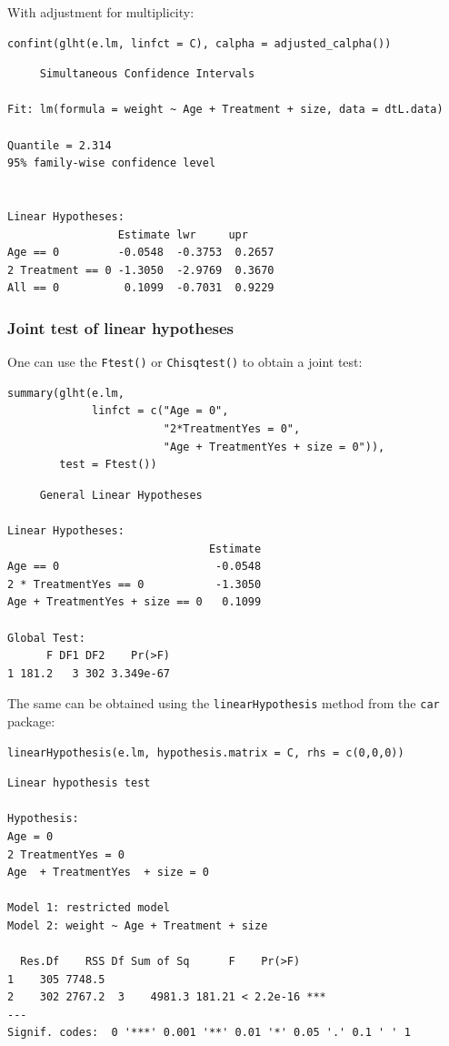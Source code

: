 \documentclass{article}
\begin{document}
With adjustment for multiplicity:
\lstset{language=r,label= ,caption= ,captionpos=b,numbers=none}
\begin{lstlisting}
confint(glht(e.lm, linfct = C), calpha = adjusted_calpha())
\end{lstlisting}

\begin{verbatim}
	 Simultaneous Confidence Intervals

Fit: lm(formula = weight ~ Age + Treatment + size, data = dtL.data)

Quantile = 2.314
95% family-wise confidence level
 

Linear Hypotheses:
                 Estimate lwr     upr    
Age == 0         -0.0548  -0.3753  0.2657
2 Treatment == 0 -1.3050  -2.9769  0.3670
All == 0          0.1099  -0.7031  0.9229
\end{verbatim}

\subsubsection{Joint test of linear hypotheses}
\label{sec:orgeec8701}

One can use the \texttt{Ftest()} or \texttt{Chisqtest()} to obtain a joint test:
\lstset{language=r,label= ,caption= ,captionpos=b,numbers=none}
\begin{lstlisting}
summary(glht(e.lm, 
			 linfct = c("Age = 0",
						"2*TreatmentYes = 0",
						"Age + TreatmentYes + size = 0")), 
		test = Ftest())
\end{lstlisting}

\begin{verbatim}
	 General Linear Hypotheses

Linear Hypotheses:
                               Estimate
Age == 0                        -0.0548
2 * TreatmentYes == 0           -1.3050
Age + TreatmentYes + size == 0   0.1099

Global Test:
      F DF1 DF2    Pr(>F)
1 181.2   3 302 3.349e-67
\end{verbatim}

The same can be obtained using the \texttt{linearHypothesis} method from the \texttt{car} package:
\lstset{language=r,label= ,caption= ,captionpos=b,numbers=none}
\begin{lstlisting}
linearHypothesis(e.lm, hypothesis.matrix = C, rhs = c(0,0,0))
\end{lstlisting}

\begin{verbatim}
Linear hypothesis test

Hypothesis:
Age = 0
2 TreatmentYes = 0
Age  + TreatmentYes  + size = 0

Model 1: restricted model
Model 2: weight ~ Age + Treatment + size

  Res.Df    RSS Df Sum of Sq      F    Pr(>F)    
1    305 7748.5                                  
2    302 2767.2  3    4981.3 181.21 < 2.2e-16 ***
---
Signif. codes:  0 '***' 0.001 '**' 0.01 '*' 0.05 '.' 0.1 ' ' 1
\end{verbatim}
\end{document}
